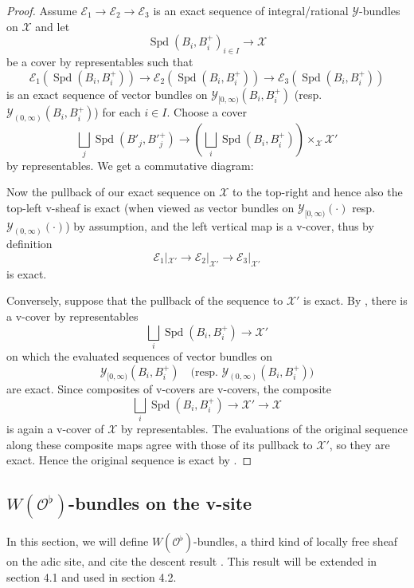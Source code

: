 \documentclass[10pt,twoside]{article}
\numberwithin{equation}{section}
\theoremstyle{plain}
\theoremstyle{definition}
\DeclareMathOperator{\Spd}{Spd}
\newcommand{\MCE}{\mathcal{E}}
\newcommand{\MCO}{\mathcal{O}}
\newcommand{\MCX}{\mathcal{X}}
\newcommand{\MCY}{\mathcal{Y}}
\newcommand{\Yco}{\MCY_{[0,\infty)}}
\newcommand{\Yoo}{\MCY_{(0,\infty)}}
\begin{document}
\begin{proof}
 Assume \(\MCE_1\to\MCE_2\to\MCE_3\) is an exact sequence of integral/rational \(\MCY\)-bundles on \(\MCX\) and let  
 \[\Spd(B_i,B_i^+)_{i\in I}\longrightarrow \MCX\] be a cover by representables such that 
 \[\MCE_1(\Spd(B_i,B_i^+))\longrightarrow \MCE_2(\Spd(B_i,B_i^+))\longrightarrow \MCE_3(\Spd(B_i,B_i^+))\]
 is an exact sequence of vector bundles on \(\Yco(B_i,B_i^+)\) (resp. \(\Yoo(B_i,B_i^+)\)) for each \(i\in I\). Choose a cover
 \[\bigsqcup_j\Spd(B'_j,B'^+_j)\longrightarrow\left(\bigsqcup_i \Spd(B_i,B^+_i)\right)\times_{\MCX}^{} \MCX'\]
 by representables. We get a commutative diagram:
    \begin{center}
    \end{center} 
    Now the pullback of our exact sequence on \(\MCX\) to the top-right and hence also the top-left v-sheaf is exact (when viewed as vector bundles on \(\Yco(\cdot)\) resp. \(\Yoo(\cdot)\)) by assumption, and the left vertical map is a v-cover, thus by definition 
    \[\MCE_1|_{\MCX'}\longrightarrow \MCE_2|_{\MCX'}\longrightarrow \MCE_3|_{\MCX'}\]
    is exact.\par
    Conversely, suppose that the pullback of the sequence to \(\MCX'\) is exact. By , there is a v-cover by representables
    \[\bigsqcup_i\Spd(B_i,B_i^+)\longrightarrow\MCX'\]
    on which the evaluated sequences of vector bundles on
    \[\Yco(B_i,B_i^+)\quad\text{(resp. }\Yoo(B_i,B_i^+)\text{)}\]
    are exact. Since composites of v-covers are v-covers, the composite
    \[\bigsqcup_i\Spd(B_i,B_i^+)\longrightarrow\MCX'\longrightarrow\MCX\]
    is again a v-cover of \(\MCX\) by representables. The evaluations of the original sequence along these composite maps agree with those of its pullback to \(\MCX'\), so they are exact. Hence the original sequence is exact by .
    \end{proof}
\subsection{\texorpdfstring{\(W(\MCO^\flat)\)-bundles on the v-site}
  {W(O♭)-bundles on the v-site}}
In this section, we will define \(W(\MCO^\flat)\)-bundles, a third kind of locally free sheaf on the adic site, and cite the descent result . This result will be extended in section 4.1 and used in section 4.2.
\end{document}
